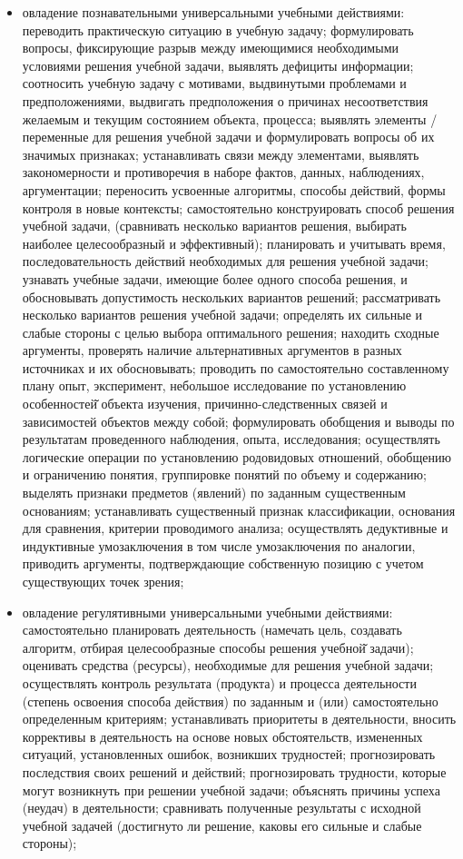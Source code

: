 \documentclass[
  11pt,
]{book}
\begin{document}
\begin{itemize}
\item
  овладение познавательными универсальными учебными действиями: переводить практическую ситуацию в учебную задачу; формулировать вопросы, фиксирующие разрыв между имеющимися необходимыми условиями решения учебной задачи, выявлять дефициты информации; соотносить учебную задачу с мотивами, выдвинутыми проблемами и предположениями, выдвигать предположения о причинах несоответствия желаемым и текущим состоянием объекта, процесса; выявлять элементы / переменные для решения учебной задачи и формулировать вопросы об их значимых признаках; устанавливать связи между элементами, выявлять закономерности и противоречия в наборе фактов, данных, наблюдениях, аргументации; переносить усвоенные алгоритмы, способы действий, формы контроля в новые контексты; самостоятельно конструировать способ решения учебной задачи, (сравнивать несколько вариантов решения, выбирать наиболее целесообразный и эффективный); планировать и учитывать время, последовательность действий необходимых для решения учебной задачи; узнавать учебные задачи, имеющие более одного способа решения, и обосновывать допустимость нескольких вариантов решений; рассматривать несколько вариантов решения учебной задачи; определять их сильные и слабые стороны с целью выбора оптимального решения; находить сходные аргументы, проверять наличие альтернативных аргументов в разных источниках и их обосновывать; проводить по самостоятельно составленному плану опыт, эксперимент, небольшое исследование по установлению особенностей̆ объекта изучения, причинно-следственных связей и зависимостей объектов между собой; формулировать обобщения и выводы по результатам проведенного наблюдения, опыта, исследования; осуществлять логические операции по установлению родовидовых отношений, обобщению и ограничению понятия, группировке понятий по объему и содержанию; выделять признаки предметов (явлений) по заданным существенным основаниям; устанавливать существенный признак классификации, основания для сравнения, критерии проводимого анализа; осуществлять дедуктивные и индуктивные умозаключения в том числе умозаключения по аналогии, приводить аргументы, подтверждающие собственную позицию с учетом существующих точек зрения;
\item
  овладение регулятивными универсальными учебными действиями: самостоятельно планировать деятельность (намечать цель, создавать алгоритм, отбирая целесообразные способы решения учебной̆ задачи); оценивать средства (ресурсы), необходимые для решения учебной задачи; осуществлять контроль результата (продукта) и процесса деятельности (степень освоения способа действия) по заданным и (или) самостоятельно определенным критериям; устанавливать приоритеты в деятельности, вносить коррективы в деятельность на основе новых обстоятельств, измененных ситуаций, установленных ошибок, возникших трудностей; прогнозировать последствия своих решений и действий; прогнозировать трудности, которые могут возникнуть при решении учебной задачи; объяснять причины успеха (неудач) в деятельности; сравнивать полученные результаты с исходной учебной задачей (достигнуто ли решение, каковы его сильные и слабые стороны);

\end{itemize}
\end{document}
